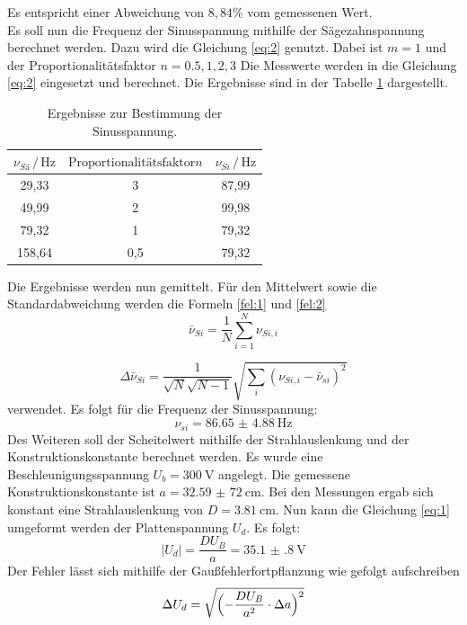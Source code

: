 Es entspricht einer Abweichung von $8,84 \%$ vom gemessenen Wert.\\
\newline
Es soll nun die Frequenz der Sinusspannung mithilfe der Sägezahnspannung
berechnet werden.
Dazu wird die Gleichung \ref{eq:2} genutzt. Dabei ist $m = 1$ und der
Proportionalitätsfaktor $n= 0.5, 1, 2, 3$
Die Messwerte werden in die Gleichung \ref{eq:2} eingesetzt und berechnet.
Die Ergebnisse sind in der Tabelle \ref{tab:3} dargestellt.
\begin{table}[H]
  \centering
  \caption{Ergebnisse zur Bestimmung der Sinusspannung.}
  \label{tab:3}
  \begin{tabular}{c c c}
\toprule
$\nu_{Sä} \,/\, \si{\hertz}$& $\text{Proportionalitätsfaktor} n$ & $\nu_{Si} \, /\, \si{\hertz}$\\
\midrule
29,33 & 3 & 87,99\\
49,99 & 2 & 99,98\\
79,32 & 1 & 79,32\\
158,64& 0,5& 79,32\\
\bottomrule
  \end{tabular}
\end{table}
Die Ergebnisse werden nun gemittelt.
Für den Mittelwert sowie die Standardabweichung werden die Formeln \ref{fel:1} und \ref{fel:2}
\begin{equation}
    \bar{\nu}_{Si}= \frac{1}{N} \sum_{i=1}^{N} \nu_{Si,i}
    \label{fel:1}
\end{equation}

\begin{equation}
  \Delta \bar{\nu}_{Si} = \frac{1}{\sqrt{N}\sqrt{N-1}} \sqrt{\sum_{i}(\nu_{Si,i}-\bar{\nu}_{si})^2}
  \label{fel:2}
\end{equation}
verwendet.
Es folgt für die Frequenz der Sinusspannung:
\begin{equation*}
  \nu_{si}= \SI{86.65(488)}{\hertz}
\end{equation*}
Des Weiteren soll der Scheitelwert mithilfe der Strahlauslenkung und der Konstruktionskonstante berechnet werden.
Es wurde eine Beschleunigungsspannung $U_b = \SI{300}{\volt}$ angelegt. Die gemessene Konstruktionskonstante ist
$a = \SI{32,59(72)}{\centi\meter}$.
Bei den Messungen ergab sich konstant eine Strahlauslenkung von $D = \SI{3.81}{\centi\meter}$.
Nun kann die Gleichung \ref{eq:1} umgeformt werden der Plattenspannung $U_d$.
Es folgt:
\begin{equation*}
  |U_d| = \frac{D U_B}{a} = \SI{35.1(8)}{\volt}
\end{equation*}
Der Fehler lässt sich mithilfe der Gaußfehlerfortpflanzung wie gefolgt aufschreiben
\begin{equation}
  \Delta U_d = \sqrt{\Bigl(-\frac{DU_B}{a^2}\cdot \Delta a\Bigr)^2}
\end{equation}
